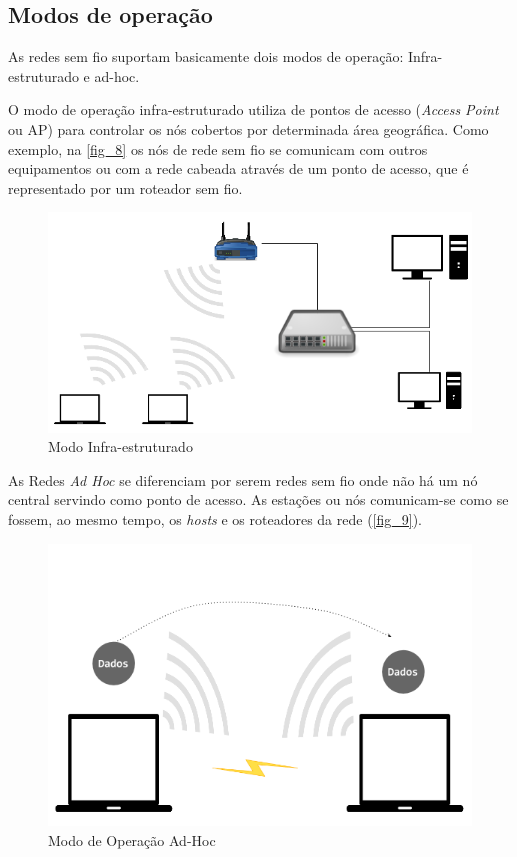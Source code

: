\documentclass[
12pt,				%
openright,			%
oneside,			%
a4paper,			%
brazil,				%
]{abntex2}
\begin{document}
	\subsection{Modos de operação}
	
	\par As redes sem fio suportam basicamente dois modos de operação: Infra-estruturado e ad-hoc.
	
	\par O modo de operação infra-estruturado utiliza de pontos de acesso (\textit{Access Point} ou AP) para controlar os nós cobertos por determinada área geográfica. Como exemplo, na \autoref{fig_8} os nós de rede sem fio se comunicam com outros equipamentos ou com a rede cabeada através de um ponto de acesso, que é representado por um roteador sem fio.
	
	\begin{figure} [H]
		\centering
		\includegraphics[scale=.5]{figuras/cap2/08ModoInfra-estruturado}
		\caption{\label{fig_8}Modo Infra-estruturado}
	\end{figure}		
	
	\par As Redes \textit{Ad Hoc} se diferenciam por serem redes sem fio onde não há um nó central servindo como ponto de acesso. As estações ou nós comunicam-se como se fossem, ao mesmo tempo, os \textit{hosts} e os roteadores da rede (\autoref{fig_9}).
	
	\begin{figure} [H]
		\centering
		\includegraphics[scale=.3]{figuras/cap2/09ModosdeOperacaoAdHoc}
		\caption{\label{fig_9}Modo de Operação Ad-Hoc}
	\end{figure}
	
\end{document}
